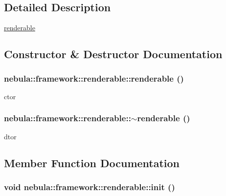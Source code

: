 \subsection{Detailed Description}
\hyperlink{classnebula_1_1framework_1_1renderable}{renderable} 

\subsection{Constructor \& Destructor Documentation}
\hypertarget{classnebula_1_1framework_1_1renderable_a73471e2ece67b41d57aa8f30cd23f555}{
\subsubsection[{renderable}]{\setlength{\rightskip}{0pt plus 5cm}nebula::framework::renderable::renderable ()}}
\label{classnebula_1_1framework_1_1renderable_a73471e2ece67b41d57aa8f30cd23f555}


ctor \hypertarget{classnebula_1_1framework_1_1renderable_ac1f325f502745a9b64f3dc737d1c6d85}{
\subsubsection[{$\sim$renderable}]{\setlength{\rightskip}{0pt plus 5cm}nebula::framework::renderable::$\sim$renderable ()}}
\label{classnebula_1_1framework_1_1renderable_ac1f325f502745a9b64f3dc737d1c6d85}


dtor 

\subsection{Member Function Documentation}
\hypertarget{classnebula_1_1framework_1_1renderable_abd26325cc94b96a9d471a63d74260406}{
\subsubsection[{init}]{\setlength{\rightskip}{0pt plus 5cm}void nebula::framework::renderable::init ()}}
\label{classnebula_1_1framework_1_1renderable_abd26325cc94b96a9d471a63d74260406}


